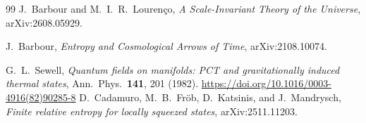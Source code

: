 \documentclass[11pt]{article}
\begin{document}
\begin{thebibliography}{99}
 J.~Barbour and M.~I.~R.~Louren\c{c}o, \emph{A Scale-Invariant Theory of the Universe}, arXiv:2608.05929.

 J.~Barbour, \emph{Entropy and Cosmological Arrows of Time}, arXiv:2108.10074.

 G.~L.~Sewell, \emph{Quantum fields on manifolds: PCT and gravitationally induced thermal states}, Ann.\ Phys.\ \textbf{141}, 201 (1982). \url{https://doi.org/10.1016/0003-4916(82)90285-8}
 D.~Cadamuro, M.~B.~Fr\"ob, D.~Katsinis, and J.~Mandrysch, \emph{Finite relative entropy for locally squeezed states}, arXiv:2511.11203.
\end{thebibliography}
\endgroup
\end{document}
